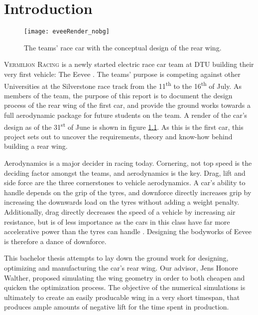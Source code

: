 \chapter{Introduction}

  \begin{figure}
    \texttt{[image: eveeRender\_nobg]}
    \caption{The teams' race car with the conceptual design of the rear wing.}
    \label{fig:EeveeRender}
  \end{figure}

  \textsc{Vermilion Racing} is a newly started electric race car team at DTU building their very first vehicle: The Eevee \cite{bulba}. The teams' purpose is competing against other Universities at the Silverstone race track from the 11\textsuperscript{th} to the 16\textsuperscript{th} of July. As members of the team, the purpose of this report is to document the design process of the rear wing of the first car, and provide the ground works towards a full aerodynamic package for future students on the team. A render of the car's design as of the 31\textsuperscript{st} of June is shown in figure \ref{fig:EeveeRender}. As this is the first car, this project sets out to uncover the requirements, theory and know-how behind building a rear wing.

  Aerodynamics is a major decider in racing today. Cornering, not top speed is the deciding factor amongst the teams, and aerodynamics is the key. Drag, lift and side force are the three cornerstones to vehicle aerodynamics. A car's ability to handle depends on the grip of the tyres, and downforce directly increases grip by increasing the downwards load on the tyres without adding a weight penalty. Additionally, drag directly decreases the speed of a vehicle by increasing air resistance, but is of less importance as the cars in this class have far more accelerative power than the tyres can handle \cite{jkatz}. Designing the bodyworks of Eevee is therefore a dance of downforce.

  This bachelor thesis attempts to lay down the ground work for designing, optimizing and manufacturing the car's rear wing. Our advisor, Jens Honore Walther, proposed simulating the wing geometry in order to both cheapen and quicken the optimization process. The objective of the numerical simulations is ultimately to create an easily producable wing in a very short timespan, that produces ample amounts of negative lift for the time spent in production.

